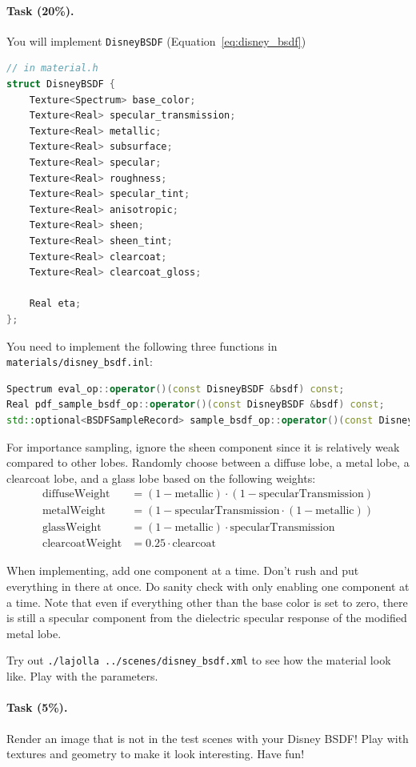 \paragraph{Task (20\%).} You will implement \lstinline{DisneyBSDF} (Equation~\ref{eq:disney_bsdf})
\begin{lstlisting}[language=c++]
// in material.h
struct DisneyBSDF {
    Texture<Spectrum> base_color;
    Texture<Real> specular_transmission;
    Texture<Real> metallic;
    Texture<Real> subsurface;
    Texture<Real> specular;
    Texture<Real> roughness;
    Texture<Real> specular_tint;
    Texture<Real> anisotropic;
    Texture<Real> sheen;
    Texture<Real> sheen_tint;
    Texture<Real> clearcoat;
    Texture<Real> clearcoat_gloss;

    Real eta;
};
\end{lstlisting}

You need to implement the following three functions in \lstinline{materials/disney_bsdf.inl}:
\begin{lstlisting}[language=c++]
Spectrum eval_op::operator()(const DisneyBSDF &bsdf) const;
Real pdf_sample_bsdf_op::operator()(const DisneyBSDF &bsdf) const;
std::optional<BSDFSampleRecord> sample_bsdf_op::operator()(const DisneyBSDF &bsdf) const;
\end{lstlisting}

For importance sampling, ignore the sheen component since it is relatively weak compared to other lobes. Randomly choose between a diffuse lobe, a metal lobe, a clearcoat lobe, and a glass lobe based on the following weights:
\begin{equation}
\begin{aligned}
\text{diffuseWeight} &= (1 - \text{metallic}) \cdot (1 - \text{specularTransmission}) \\
\text{metalWeight} &= (1 - \text{specularTransmission} \cdot (1 - \text{metallic})) \\
\text{glassWeight} &= (1 - \text{metallic}) \cdot \text{specularTransmission} \\
\text{clearcoatWeight} &= 0.25 \cdot \text{clearcoat}
\end{aligned}
\end{equation}

When implementing, add one component at a time. Don't rush and put everything in there at once. Do sanity check with only enabling one component at a time. Note that even if everything other than the base color is set to zero, there is still a specular component from the dielectric specular response of the modified metal lobe. 

Try out \lstinline{./lajolla ../scenes/disney_bsdf.xml} to see how the material look like. Play with the parameters.

\paragraph{Task (5\%).} Render an image that is not in the test scenes with your Disney BSDF! Play with textures and geometry to make it look interesting. Have fun!




